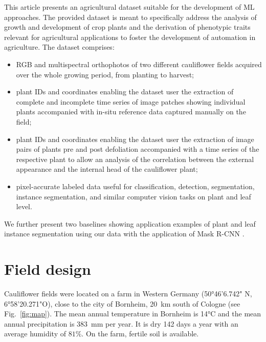 \documentclass{article}
\def\figref#1{Fig.~\ref{#1}}
\begin{document}
This article presents an agricultural dataset suitable for the development of ML approaches.
The provided dataset is meant to specifically address the analysis of growth and development of crop plants and the derivation of phenotypic traits relevant for agricultural applications to foster the development of automation in agriculture. 
The dataset comprises:
\begin{itemize}
    \item RGB and multispectral orthophotos of two different cauliflower fields acquired over the whole growing period, from planting to harvest;
    \item plant IDs and coordinates enabling the dataset user the extraction of complete and incomplete time series of image patches showing individual plants accompanied with in-situ reference data captured manually on the field;
    \item plant IDs and coordinates enabling the dataset user the extraction of image pairs of plants pre and post defoliation accompanied with a time series of the respective plant to allow an analysis of the correlation between the external appearance and the internal head of the cauliflower plant;
    \item pixel-accurate labeled data useful for classification, detection, segmentation, instance segmentation, and similar computer vision tasks on plant and leaf level.
\end{itemize}
We further present two baselines showing application examples of plant and leaf instance segmentation using our data with the application of Mask R-CNN \citep{he2017mask}.

\section{Field design}\label{sec:fieldDesign}
Cauliflower fields were located on a farm in Western Germany (50°46'6.742" N, 6°58'20.271"O), close to the city of Bornheim, \SI{20}{\kilo\meter} south of Cologne (see \figref{fig:map}).
The mean annual temperature in Bornheim is 14°C and the mean annual precipitation is \SI{383}{\milli\meter} per year. It is dry 142 days a year with an average humidity of $81\%$. On the farm, fertile soil is available.
\end{document}
